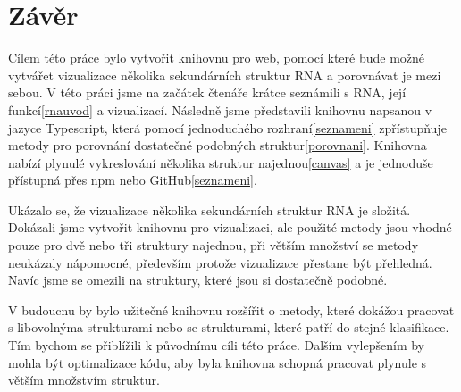 \chapter*{Závěr}

Cílem této práce bylo vytvořit knihovnu pro web, pomocí které bude možné
vytvářet vizualizace několika sekundárních struktur RNA a porovnávat je mezi
sebou. V této práci jsme na začátek čtenáře krátce seznámili s RNA, její
funkcí\ref{rnauvod} a vizualizací. Následně jsme představili knihovnu napsanou
v jazyce Typescript, která pomocí jednoduchého rozhraní\ref{seznameni}
zpřístupňuje metody pro porovnání dostatečné podobných struktur\ref{porovnani}.
Knihovna nabízí plynulé vykreslování několika struktur najednou\ref{canvas} a
je jednoduše přístupná přes npm nebo GitHub\ref{seznameni}.

Ukázalo se, že vizualizace několika sekundárních struktur RNA je složitá.
Dokázali jsme vytvořit knihovnu pro vizualizaci, ale použité metody jsou vhodné
pouze pro dvě nebo tři struktury najednou, při větším množství se metody
neukázaly nápomocné, především protože vizualizace přestane být přehledná.
Navíc jsme se omezili na struktury, které jsou si dostatečně podobné.

V budoucnu by bylo užitečné knihovnu rozšířit o metody, které dokážou pracovat
s libovolnýma strukturami nebo se strukturami, které patří do stejné
klasifikace\cite{rfam}. Tím bychom se přiblížili k původnímu cíli této práce.
Dalším vylepšením by mohla být optimalizace kódu, aby byla knihovna schopná
pracovat plynule s větším množstvím struktur.
